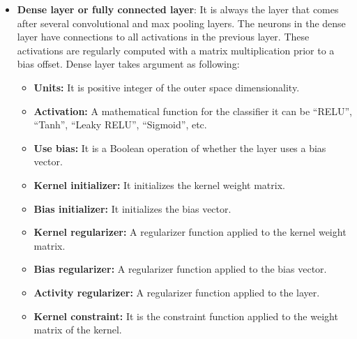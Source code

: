 \begin{itemize}
\begin{figure}[ht]
    \label{fig:la}
    \end{figure}
    \item \textbf{Dense layer or fully connected layer}: It is always the layer that comes after several convolutional and max pooling layers. The neurons in the dense layer have connections to all activations in the previous layer. These activations are regularly computed with a matrix multiplication prior to a bias offset.
    \newpage
    Dense layer takes argument as following:\hfill \\
    \noindent{}
\begin{itemize}
    \item \textbf{Units:} It is positive integer of the outer space dimensionality.
    \item \textbf{Activation:} A mathematical function for the classifier it can be “RELU”, “Tanh”, “Leaky RELU”, “Sigmoid”, etc.
    \item \textbf{Use bias:} It is a Boolean operation of whether the layer uses a bias vector.
    \item \textbf{Kernel initializer:} It initializes the kernel weight matrix.
    \item \textbf{Bias initializer:} It initializes the bias vector.
    \item \textbf{Kernel regularizer:} A regularizer function applied to the kernel weight matrix.
    \item \textbf{Bias regularizer:} A regularizer function applied to the bias vector.
    \item \textbf{Activity regularizer:} A regularizer function applied to the layer.
    \item \textbf{Kernel constraint:} It is the constraint function applied to the weight matrix of the kernel.

\end{itemize}
\end{itemize}
